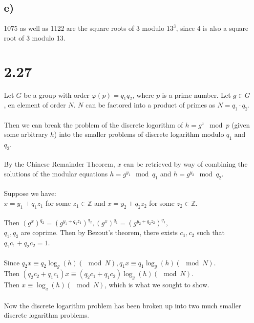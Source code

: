 \documentclass{article}
\begin{document}
\subsection{e)}
1075 as well as 1122 are the square roots of 3 modulo $13^3$, since 4 is also a square root of 3 modulo 13.

\section{2.27}
Let $G$ be a group with order $\varphi(p) = q_1q_2$,
where $p$ is a prime number.
Let $g \in G$, en element of order $N$.
$N$ can be factored into a product of primes as
$N = q_1 \cdot q_2$.
\\\\
Then we can break the problem of the discrete logorithm of $h = g^x
\mod{p}$ (given some arbitrary $h$) into the smaller problems of
discrete logarithm modulo $q_1$ and $q_2$.
\\\\
By the Chinese Remainder Theorem, $x$ can be retrieved by
way of combining the solutions of the modular equations
$h = g^{y_1} \mod{q_1}$ and $h = g^{y_2} \mod{q_2}$.
\\\\
Suppose we have:
\\
$x = y_1 + q_1z_1$ for some $z_1 \in \mathbb{Z}$ and
$x = y_2 + q_2z_2$ for some $z_2 \in \mathbb{Z}$.
\\\\
Then $(g^x)^{q_2} = (g^{y_1 + q_1z_1})^{q_2}, (g^x)^{q_1} = (g^{y_2 + q_2z_2})^{q_1}$,
\\
$q_1, q_2$ are coprime. Then by Bezout's theorem, there exists $c_1, c_2$
such that $q_1c_1 + q_2c_2 = 1$.
\\\\
Since $q_2x \equiv q_2\log_g{(h)} (\mod{N}),
q_1x \equiv q_1\log_g{(h)} (\mod{N})$.
\\
Then $(q_2c_2 + q_1c_1)x \equiv (q_2c_1 + q_1c_2) \log_g{(h)} (\mod{N})$.
\\
Then $x \equiv \log_g{(h)} (\mod{N})$, which is what we sought to show.
\\\\
Now the discrete logarithm problem has been broken up into two much smaller discrete logarithm problems.
\end{document}

